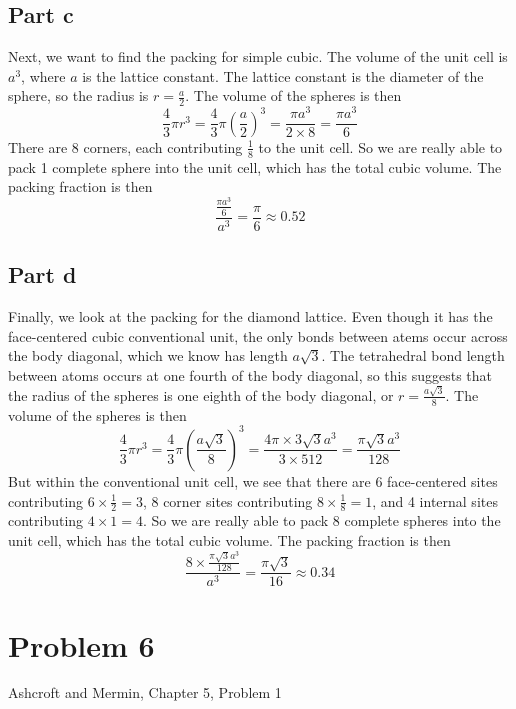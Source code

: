\documentclass[12pt]{article}
\begin{document}
\subsection{Part c}
Next, we want to find the packing for simple cubic. The volume of the unit cell is \(a^3\), where \(a\) is the lattice constant. The lattice constant is the diameter of the sphere, so the radius is \(r = \frac{a}{2}\). The volume of the spheres is then
\begin{equation}
    \frac{4}{3}\pi r^3 = \frac{4}{3}\pi \left(\frac{a}{2}\right)^3 = \frac{\pi a^3}{2 \times 8} = \frac{\pi a^3}{6}
\end{equation}
There are 8 corners, each contributing \(\frac{1}{8}\) to the unit cell. So we are really able to pack 1 complete sphere into the unit cell, which has the total cubic volume. The packing fraction is then
\begin{equation}
    \frac{\frac{\pi a^3}{6}}{a^3} = \frac{\pi}{6} \approx 0.52
\end{equation}
\subsection{Part d}
Finally, we look at the packing for the diamond lattice. Even though it has the face-centered cubic conventional unit, the only bonds between atems occur across the body diagonal, which we know has length \(a\sqrt{3}\). The tetrahedral bond length between atoms occurs at one fourth of the body diagonal, so this suggests that the radius of the spheres is one eighth of the body diagonal, or \(r = \frac{a\sqrt{3}}{8}\). The volume of the spheres is then
\begin{equation}
    \frac{4}{3}\pi r^3 = \frac{4}{3}\pi \left(\frac{a\sqrt{3}}{8}\right)^3 = \frac{4\pi \times 3\sqrt{3}a^3}{3 \times 512} = \frac{\pi\sqrt{3}a^3}{128}
\end{equation}
But within the conventional unit cell, we see that there are 6 face-centered sites contributing $6\times\frac{1}{2} = 3$, 8 corner sites contributing $8\times\frac{1}{8} = 1$, and 4 internal sites contributing $4\times 1 = 4$. So we are really able to pack 8 complete spheres into the unit cell, which has the total cubic volume. The packing fraction is then
\begin{equation}
    \frac{8 \times \frac{\pi\sqrt{3}a^3}{128}}{a^3} = \frac{\pi\sqrt{3}}{16} \approx 0.34
\end{equation}

\section{Problem 6}
Ashcroft and Mermin, Chapter 5, Problem 1
\end{document}
